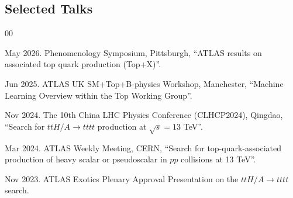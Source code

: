 \begin{achievements}
\subsection*{Selected Talks}

\begin{bibliolist}{00}
  \item May 2026. Phenomenology Symposium, Pittsburgh, ``ATLAS results on associated top quark production (Top+X)''.
  \item Jun 2025. ATLAS UK SM+Top+B-physics Workshop, Manchester, ``Machine Learning Overview within the Top Working Group''.
  \item Nov 2024. The 10th China LHC Physics Conference (CLHCP2024), Qingdao, ``Search for $ttH/A \to tttt$ production at $\sqrt{s}=13$ TeV''.
  \item Mar 2024. ATLAS Weekly Meeting, CERN, ``Search for top-quark-associated production of heavy scalar or pseudoscalar in $pp$ collisions at 13 TeV''.
  \item Nov 2023. ATLAS Exotics Plenary Approval Presentation on the $ttH/A \to tttt$ search.
\end{bibliolist}

\end{achievements}
